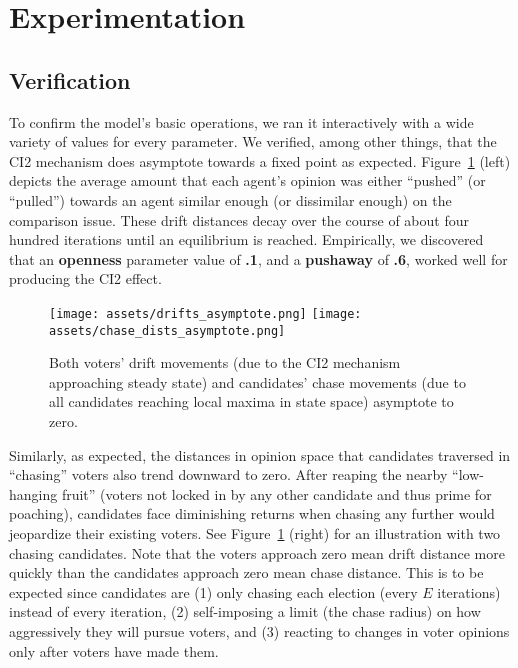 \section{Experimentation}
\label{sec:experimentation}

\subsection{Verification}

To confirm the model's basic operations, we ran it interactively with a wide
variety of values for every parameter. We verified, among other things, that
the CI2 mechanism does asymptote towards a fixed point as expected.
Figure~\ref{drifts_and_chases_asymptote} (left) depicts the average amount that each
agent's opinion was either ``pushed'' (or ``pulled'') towards an agent similar
enough (or dissimilar enough) on the comparison issue. These drift distances
decay over the course of about four hundred iterations until an equilibrium is
reached. Empirically, we discovered that an \textbf{openness} parameter value
of \textbf{.1}, and a \textbf{pushaway} of \textbf{.6}, worked well for
producing the CI2 effect.

\begin{figure}[ht]
\centering
\texttt{[image: assets/drifts\_asymptote.png]}
\texttt{[image: assets/chase\_dists\_asymptote.png]}
\caption{Both voters' drift movements (due to the CI2 mechanism approaching steady
state) and candidates' chase movements (due to all candidates reaching local
maxima in state space) asymptote to zero.}
\label{drifts_and_chases_asymptote}
\end{figure}

Similarly, as expected, the distances in opinion space that candidates
traversed in ``chasing'' voters also trend downward to zero. After reaping the
nearby ``low-hanging fruit'' (voters not locked in by any other candidate and
thus prime for poaching), candidates face diminishing returns when chasing any
further would jeopardize their existing voters. See
Figure~\ref{drifts_and_chases_asymptote} (right) for an illustration with two
chasing candidates. Note that the voters approach zero mean drift distance more
quickly than the candidates approach zero mean chase distance. This is to be
expected since candidates are (1) only chasing each election (every $E$
iterations) instead of every iteration, (2) self-imposing a limit (the chase
radius) on how aggressively they will pursue voters, and (3) reacting to
changes in voter opinions only after voters have made them.


